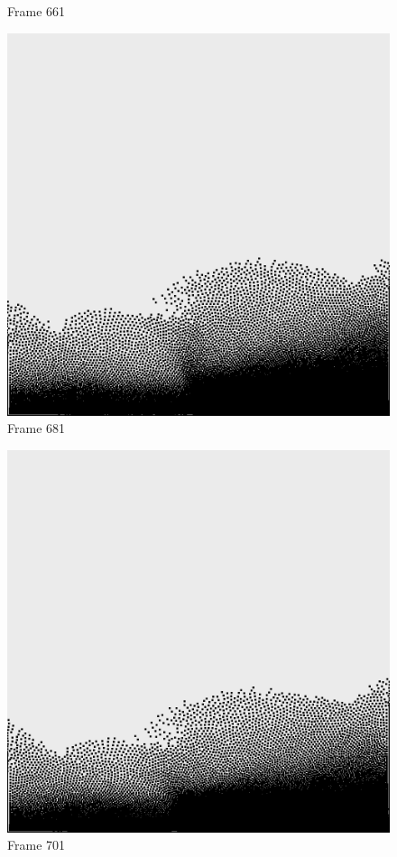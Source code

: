 \documentclass[a4paper, 12pt, oneside]{book}
\begin{document}
\begin{figure}[!ht]
\begin{center}
            Frame 661
        \end{center}
    \endminipage
    \hfill
        \begin{center}
            \includegraphics[width=\linewidth]{images/test_case_2/681.png}
            Frame 681
        \end{center}
    \endminipage
    \hfill
        \begin{center}
            \includegraphics[width=\linewidth]{images/test_case_2/701.png}
            Frame 701
        \end{center}
    \endminipage
    \hfill


\end{figure}
\end{document}
